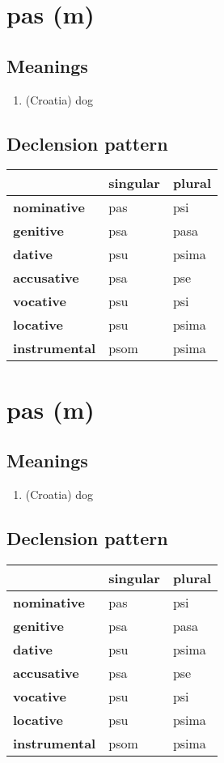 \filbreak
\section{pas (m)}
\subsection*{Meanings}
\begin{enumerate}
\item (Croatia) dog
\end{enumerate}
\subsection*{Declension pattern}
\begin{tabularx}{\linewidth}{Xll}
\toprule
{} & singular & plural \\
\midrule
\textbf{nominative  } &      pas &    psi \\
\textbf{genitive    } &      psa &   pasa \\
\textbf{dative      } &      psu &  psima \\
\textbf{accusative  } &      psa &    pse \\
\textbf{vocative    } &      psu &    psi \\
\textbf{locative    } &      psu &  psima \\
\textbf{instrumental} &     psom &  psima \\
\bottomrule
\end{tabularx}

\filbreak
\section{pas (m)}
\subsection*{Meanings}
\begin{enumerate}
\item (Croatia) dog
\end{enumerate}
\subsection*{Declension pattern}
\begin{tabularx}{\linewidth}{Xll}
\toprule
{} & singular & plural \\
\midrule
\textbf{nominative  } &      pas &    psi \\
\textbf{genitive    } &      psa &   pasa \\
\textbf{dative      } &      psu &  psima \\
\textbf{accusative  } &      psa &    pse \\
\textbf{vocative    } &      psu &    psi \\
\textbf{locative    } &      psu &  psima \\
\textbf{instrumental} &     psom &  psima \\
\bottomrule
\end{tabularx}

